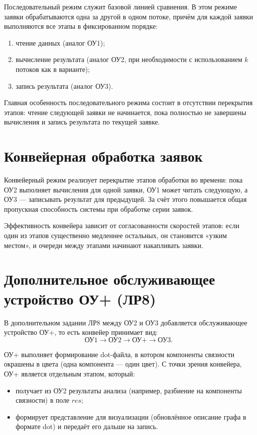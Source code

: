 Последовательный режим служит базовой линией сравнения.
В этом режиме заявки обрабатываются одна за другой в одном потоке, причём для каждой заявки выполняются все этапы в фиксированном порядке:
\begin{enumerate}
	\item чтение данных (аналог ОУ1);
	\item вычисление результата (аналог ОУ2, при необходимости с использованием $k$ потоков как в варианте);
	\item запись результата (аналог ОУ3).
\end{enumerate}

Главная особенность последовательного режима состоит в отсутствии перекрытия этапов: чтение следующей заявки не начинается, пока полностью не завершены вычисления и запись результата по текущей заявке.

\section{Конвейерная обработка заявок}

Конвейерный режим реализует перекрытие этапов обработки во времени:
пока ОУ2 выполняет вычисления для одной заявки, ОУ1 может читать следующую, а ОУ3 --- записывать результат для предыдущей.
За счёт этого повышается общая пропускная способность системы при обработке серии заявок.

Эффективность конвейера зависит от согласованности скоростей этапов:
если один из этапов существенно медленнее остальных, он становится «узким местом», и очереди между этапами начинают накапливать заявки.

\section{Дополнительное обслуживающее устройство ОУ+ (ЛР8)}

В дополнительном задании ЛР8 между ОУ2 и ОУ3 добавляется обслуживающее устройство ОУ+, то есть конвейер принимает вид:
\[
\text{ОУ1} \rightarrow \text{ОУ2} \rightarrow \text{ОУ+} \rightarrow \text{ОУ3}.
\]

ОУ+ выполняет формирование dot-файла, в котором компоненты связности окрашены в цвета (одна компонента --- один цвет).
С точки зрения конвейера, ОУ+ является отдельным этапом, который:
\begin{itemize}
	\item получает из ОУ2 результаты анализа (например, разбиение на компоненты связности) в поле $res$;
	\item формирует представление для визуализации (обновлённое описание графа в формате dot) и передаёт его дальше на запись.
\end{itemize}

